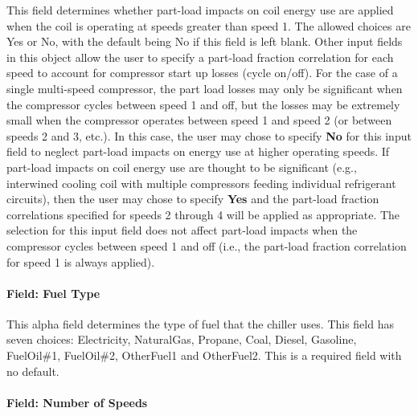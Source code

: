 This field determines whether part-load impacts on coil energy use are applied when the coil is operating at speeds greater than speed 1. The allowed choices are Yes or No, with the default being No if this field is left blank. Other input fields in this object allow the user to specify a part-load fraction correlation for each speed to account for compressor start up losses (cycle on/off). For the case of a single multi-speed compressor, the part load losses may only be significant when the compressor cycles between speed 1 and off, but the losses may be extremely small when the compressor operates between speed 1 and speed 2 (or between speeds 2 and 3, etc.). In this case, the user may chose to specify \textbf{No} for this input field to neglect part-load impacts on energy use at higher operating speeds. If part-load impacts on coil energy use are thought to be significant (e.g., interwined cooling coil with multiple compressors feeding individual refrigerant circuits), then the user may chose to specify \textbf{Yes} and the part-load fraction correlations specified for speeds 2 through 4 will be applied as appropriate. The selection for this input field does not affect part-load impacts when the compressor cycles between speed 1 and off (i.e., the part-load fraction correlation for speed 1 is always applied).

\paragraph{Field: Fuel Type}\label{field-fuel-type-1-000}

This alpha field determines the type of fuel that the chiller uses. This field has seven choices: Electricity, NaturalGas, Propane, Coal, Diesel, Gasoline, FuelOil\#1, FuelOil\#2, OtherFuel1 and OtherFuel2. This is a required field with no default.

\paragraph{Field: Number of Speeds}\label{field-number-of-speeds-2}

